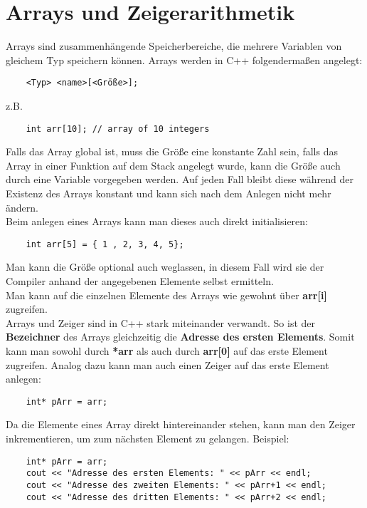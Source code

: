 \documentclass[
  accentcolor=tud1c,	%
  colorbacktitle,		%
  inverttitle,			%
  german,				%
  twoside
]{tudexercise}
\begin{document}
\section{Arrays und Zeigerarithmetik}
Arrays sind zusammenhängende Speicherbereiche, die mehrere Variablen von gleichem Typ speichern können. Arrays werden in C++ folgendermaßen angelegt:

\begin{lstlisting}
	<Typ> <name>[<Größe>];
\end{lstlisting}

z.B.
\begin{lstlisting}
	int arr[10]; // array of 10 integers
\end{lstlisting}

Falls das Array global ist, muss die Größe eine konstante Zahl sein, falls das Array in einer Funktion auf dem Stack angelegt wurde, kann die Größe auch durch eine Variable vorgegeben werden. Auf jeden Fall bleibt diese während der Existenz des Arrays konstant und kann sich nach dem Anlegen nicht mehr ändern.\\
Beim anlegen eines Arrays kann man dieses auch direkt initialisieren:
\begin{lstlisting}
	int arr[5] = { 1 , 2, 3, 4, 5};
\end{lstlisting}
Man kann die Größe optional auch weglassen, in diesem Fall wird sie der Compiler anhand der angegebenen Elemente selbst ermitteln. \\

Man kann auf die einzelnen Elemente des Arrays wie gewohnt über 
\textbf{arr[i]}
zugreifen. \\

Arrays und Zeiger sind in C++ stark miteinander verwandt. So ist der \textbf{Bezeichner} des Arrays gleichzeitig die \textbf{Adresse des ersten Elements}. Somit kann man sowohl durch \textbf{*arr} als auch durch \textbf{arr[0]} auf das erste Element zugreifen.
Analog dazu kann man auch einen Zeiger auf das erste Element anlegen:
\begin{lstlisting}
	int* pArr = arr;
\end{lstlisting}
Da die Elemente eines Array direkt hintereinander stehen, kann man den Zeiger inkrementieren, um zum  nächsten Element zu gelangen. Beispiel:

\begin{lstlisting}
	int* pArr = arr;
	cout << "Adresse des ersten Elements: " << pArr << endl;
	cout << "Adresse des zweiten Elements: " << pArr+1 << endl;
	cout << "Adresse des dritten Elements: " << pArr+2 << endl;
\end{lstlisting}
\end{document}
